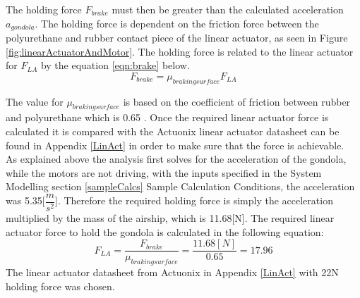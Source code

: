 \documentclass[../main.tex]{subfiles}
\begin{document}
The holding force $F_{brake}$ must then be greater than the calculated acceleration $a_{gondola}$. The holding force is dependent on the friction force between the polyurethane and rubber contact piece of the linear actuator, as seen in Figure \ref{fig:linearActuatorAndMotor}.  The holding force is related to the linear actuator for $F_{LA}$ by the equation \ref{eqn:brake} below.
\begin{equation}
\label{eqn:brake}
F_{brake} = \mu_{braking surface} F_{LA}
\end{equation}

The value for $\mu_{braking surface}$ is based on the coefficient of friction between rubber and polyurethane which is 0.65 \cite{Friction}. Once the required linear actuator force is calculated it is compared with the Actuonix linear actuator datasheet can be found in Appendix \ref{LinAct} in order to make sure that the force is achievable.\\

As explained above the analysis first solves for the acceleration of the gondola, while the motors are not driving, with the inputs specified in the System Modelling section \ref{sampleCalcs} Sample Calculation Conditions, the acceleration was 5.35[$\dfrac{m}{s^2}$]. Therefore the required holding force is simply the acceleration multiplied by the mass of the airship, which is 11.68[N]. The required linear actuator force to hold the gondola is calculated in the following equation:
\begin{equation}
\label{eqn:brake}
F_{LA} = \frac{F_{brake}}{\mu_{braking surface} } = \frac{11.68[N]}{0.65} = 17.96
\end{equation}
The linear actuator datasheet from Actuonix in Appendix \ref{LinAct} with 22N holding force was chosen. 
\end{document}
